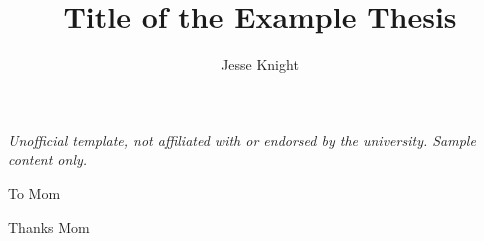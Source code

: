 \documentclass{ut-thesis}
\author{Jesse Knight}
\title{Title of the Example Thesis}
\begin{document}
  \frontmatter
    \maketitle
\thispagestyle{empty}\begin{center}{\footnotesize\itshape Unofficial template, not affiliated with or endorsed by the university. Sample content only.\par}\end{center}
    \begin{abstract}
      
    \end{abstract}
    \begin{dedication}
      To Mom
    \end{dedication}
    \begin{acknowledgements}
      Thanks Mom
    \end{acknowledgements}
    \tableofcontents
    \listoftables
    \listoffigures
  \mainmatter
    
    
    
  \appendix
    
  \backmatter
  \printbibliography[heading=bibintoc]
  \lipsum[1-6]
\end{document}

